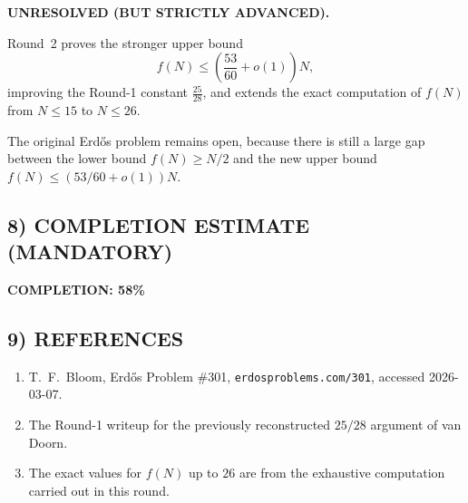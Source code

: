 \textbf{UNRESOLVED (BUT STRICTLY ADVANCED).}

Round~2 proves the stronger upper bound
\[
f(N)\le \left(\frac{53}{60}+o(1)\right)N,
\]
improving the Round-1 constant $\frac{25}{28}$, and extends the exact computation of $f(N)$ from $N\le 15$ to $N\le 26$.

The original Erd\H{o}s problem remains open, because there is still a large gap between the lower bound $f(N)\ge N/2$ and the new upper bound $f(N)\le (53/60+o(1))N$.

\subsection*{8) COMPLETION ESTIMATE (MANDATORY)}

\textbf{COMPLETION: 58\%}

\subsection*{9) REFERENCES}

\begin{enumerate}
\item T.~F.~Bloom, Erd\H{o}s Problem \#301, \texttt{erdosproblems.com/301}, accessed 2026-03-07.
\item The Round-1 writeup for the previously reconstructed $25/28$ argument of van Doorn.
\item The exact values for $f(N)$ up to $26$ are from the exhaustive computation carried out in this round.
\end{enumerate}
